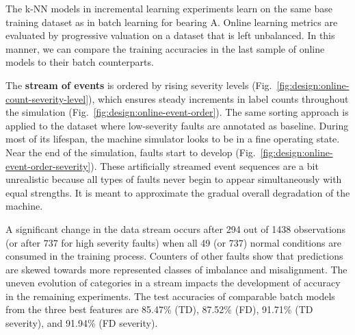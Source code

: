 The k-NN models in incremental learning experiments learn on the same base training dataset as in batch learning for bearing A. Online learning metrics are evaluated by progressive valuation on a dataset that is left unbalanced. In this manner, we can compare the training accuracies in the last sample of online models to their batch counterparts.

The \textbf{stream of events} is ordered by rising severity levels (Fig.~\ref{fig:design:online-count-severity-level}), which ensures steady increments in label counts throughout the simulation (Fig.~\ref{fig:design:online-event-order}). The same sorting approach is applied to the dataset where low-severity faults are annotated as baseline. During most of its lifespan, the machine simulator looks to be in a fine operating state. Near the end of the simulation, faults start to develop (Fig.~\ref{fig:design:online-event-order-severity}). These artificially streamed event sequences are a bit unrealistic because all types of faults never begin to appear simultaneously with equal strengths. It is meant to approximate the gradual overall degradation of the machine.

A significant change in the data stream occurs after 294 out of 1438 observations (or after 737 for high severity faults) when all 49 (or 737) normal conditions are consumed in the training process. Counters of other faults show that predictions are skewed towards more represented classes of imbalance and misalignment. The uneven evolution of categories in a stream impacts the development of accuracy in the remaining experiments. The test accuracies of comparable batch models from the three best features are 85.47\% (TD), 87.52\% (FD), 91.71\% (TD severity), and 91.94\% (FD severity).


